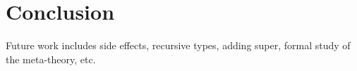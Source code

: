 \section{Conclusion}

Future work includes side effects, recursive types, adding super, formal study
of the meta-theory, etc.
